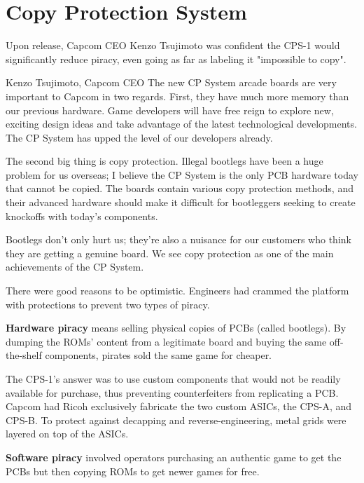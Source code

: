 

\section{Copy Protection System}

Upon release, Capcom CEO Kenzo Tsujimoto was confident the CPS-1 would significantly reduce piracy, even going as far as labeling it "impossible to copy".

\begin{q}{Kenzo Tsujimoto, Capcom CEO\cite{gamest38}}
The new CP System arcade boards are very important to Capcom in two regards. First, they have much more memory than our previous hardware. Game developers will have free reign to explore new, exciting design ideas and take advantage of the latest technological developments. The CP System has upped the level of our developers already.

The second big thing is copy protection. Illegal bootlegs have been a huge problem for us overseas; I believe the CP System is the only PCB hardware today that cannot be copied. The boards contain various copy protection methods, and their advanced hardware should make it difficult for bootleggers seeking to create knockoffs with today's components. 

Bootlegs don't only hurt us; they're also a nuisance for our customers who think they are getting a genuine board. We see copy protection as one of the main achievements of the CP System.
\end{q}


There were good reasons to be optimistic. Engineers had crammed the platform with protections to prevent two types of piracy.


\textbf{Hardware piracy} means selling physical copies of PCBs (called bootlegs). By dumping the ROMs' content from a legitimate board and buying the same off-the-shelf components, pirates sold the same game for cheaper.

The CPS-1's answer was to use custom components that would not be readily available for purchase, thus preventing counterfeiters from replicating a PCB. Capcom had Ricoh exclusively fabricate the two custom ASICs, the CPS-A, and CPS-B. To protect against decapping and reverse-engineering, metal grids were layered on top of the ASICs\cite{arcadeHackerCPS1Rev}. 


\textbf{Software piracy} involved operators purchasing an authentic game to get the PCBs but then copying ROMs to get newer games for free. 

